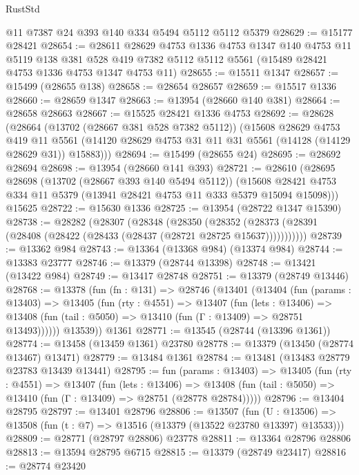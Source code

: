 \begin{lexlean}{RustStd}
\begin{coremodule}
    @11
    @7387
    @24
    @393
    @140
    @334
    @5494
    @5112
    @5112
    @5379
@28629 := @15177 @28421
@28654 := @28611
    @28629
    @4753
    @1336
    @4753
    @1347
    @140
    @4753
    @11
    @5119
    @138
    @381
    @528
    @419
    @7382
    @5112
    @5112
    @5561
    (@15489 @28421 @4753 @1336 @4753 @1347 @4753 @11)
@28655 := @15511 @1347
@28657 := @15499 (@28655 @138)
@28658 := @28654 @28657
@28659 := @15517 @1336
@28660 := @28659 @1347
@28663 := @13954 (@28660 @140 @381)
@28664 := @28658 @28663
@28667 := @15525 @28421 @1336 @4753
@28692 := @28628
    (@28664
      (@13702 (@28667 @381 @528 @7382 @5112))
      (@15608
        @28629
        @4753
        @419
        @11
        @5561
        (@14120 @28629 @4753 @31 @11 @31 @5561 (@14128 (@14129 @28629 @31)) @15883)))
@28694 := @15499 (@28655 @24)
@28695 := @28692 @28694
@28698 := @13954 (@28660 @141 @393)
@28721 := @28610
    (@28695
      @28698
      (@13702 (@28667 @393 @140 @5494 @5112))
      (@15608 @28421 @4753 @334 @11 @5379 (@13941 @28421 @4753 @11 @333 @5379 @15094 @15098)))
    @15625
@28722 := @15630 @1336
@28725 := @13954 (@28722 @1347 @15390)
@28738 := @28282
    (@28307
      (@28348
        (@28350
          (@28352 (@28373 (@28391 (@28408 (@28422 (@28433 (@28437 (@28721 @28725 @15637)))))))))))
@28739 := @13362 @984
@28743 := @13364 (@13368 @984) (@13374 @984)
@28744 := @13383 @23777
@28746 := @13379 (@28744 @13398)
@28748 := @13421 (@13422 @984)
@28749 := @13417 @28748
@28751 := @13379 (@28749 @13446)
@28768 := @13378
    (fun (fn : @131) =>
    @28746
      (@13401
        (@13404
          (fun (params : @13403) =>
          @13405
            (fun (rty : @4551) =>
            @13407
              (fun (lets : @13406) =>
              @13408 (fun (tail : @5050) => @13410 (fun (Γ : @13409) => @28751 @13493))))))
        @13539))
    @1361
@28771 := @13545 (@28744 (@13396 @1361))
@28774 := @13458 (@13459 @1361) @23780
@28778 := @13379 (@13450 (@28774 @13467) @13471)
@28779 := @13484 @1361
@28784 := @13481 (@13483 @28779 @23783 @13439 @13441)
@28795 := fun (params : @13403) =>
  @13405
    (fun (rty : @4551) =>
    @13407
      (fun (lets : @13406) =>
      @13408 (fun (tail : @5050) => @13410 (fun (Γ : @13409) => @28751 (@28778 @28784)))))
@28796 := @13404 @28795
@28797 := @13401 @28796
@28806 := @13507
    (fun (U : @13506) => @13508 (fun (t : @7) => @13516 (@13379 (@13522 @23780 @13397) @13533)))
@28809 := @28771 (@28797 @28806) @23778
@28811 := @13364 @28796 @28806
@28813 := @13594 @28795 @6715
@28815 := @13379 (@28749 @23417)
@28816 := @28774 @23420

\end{coremodule}
\end{lexlean}
